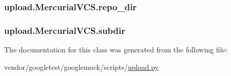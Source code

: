 \subsubsection[{\texorpdfstring{repo\+\_\+dir}{repo_dir}}]{\setlength{\rightskip}{0pt plus 5cm}upload.\+Mercurial\+V\+C\+S.\+repo\+\_\+dir}\hypertarget{classupload_1_1MercurialVCS_a219c1e0ab9ce864e3231913762ea489b}{}\label{classupload_1_1MercurialVCS_a219c1e0ab9ce864e3231913762ea489b}
\subsubsection[{\texorpdfstring{subdir}{subdir}}]{\setlength{\rightskip}{0pt plus 5cm}upload.\+Mercurial\+V\+C\+S.\+subdir}\hypertarget{classupload_1_1MercurialVCS_a0dad32e621f5523e3430d867184f0b42}{}\label{classupload_1_1MercurialVCS_a0dad32e621f5523e3430d867184f0b42}


The documentation for this class was generated from the following file\+:\begin{DoxyCompactItemize}
\item 
vendor/googletest/googlemock/scripts/\hyperlink{googlemock_2scripts_2upload_8py}{upload.\+py}\end{DoxyCompactItemize}
